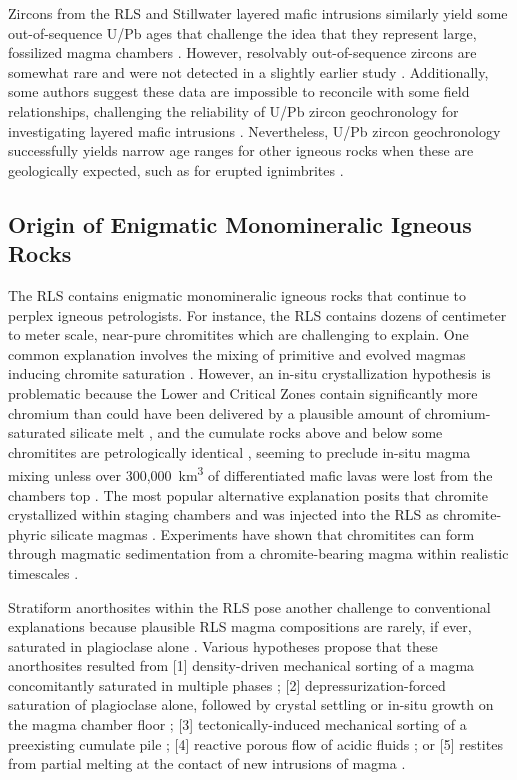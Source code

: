 Zircons from the RLS and Stillwater layered mafic intrusions similarly
yield some out-of-sequence U/Pb ages that challenge the idea that they
represent large, fossilized magma chambers \citep{mungall2016,wall2018,scoates2021}. However, resolvably out-of-sequence
zircons are somewhat rare and were not detected in a slightly earlier
study \citep{zeh2015}. Additionally, some authors suggest these data
are impossible to reconcile with some field relationships, challenging
the reliability of U/Pb zircon geochronology for investigating layered
mafic intrusions \citep{latypovchistyakova2022}. Nevertheless, U/Pb
zircon geochronology successfully yields narrow
age ranges for other igneous rocks when these are geologically expected, such as
for erupted ignimbrites \citep{wotzlaw2013}.

\subsection{Origin of Enigmatic Monomineralic Igneous Rocks}
\label{sec:ch5-origin-of-enigmatic-monomineralic-igneous-rocks}

The RLS contains enigmatic monomineralic igneous rocks that continue to
perplex igneous petrologists. For instance, the RLS contains dozens of
centimeter to meter scale, near-pure chromitites which are challenging
to explain. One common explanation involves the mixing of primitive and
evolved magmas inducing chromite saturation \citep{irvine1977}. However, an
in-situ crystallization hypothesis is problematic because the Lower and
Critical Zones contain significantly more chromium than could have been
delivered by a plausible amount of chromium-saturated silicate melt
\citep{eales2000}, and the cumulate rocks above and below some chromitites
are petrologically identical \citep{mondal2007}, seeming to
preclude in-situ magma mixing unless over 300,000~km\textsuperscript{3} of differentiated
mafic lavas were lost from the chamber\textquotesingle s top \citep{cawthornwalraven1998}. The most popular alternative explanation posits
that chromite crystallized within staging chambers and was injected into
the RLS as chromite-phyric silicate magmas \citep{mondal2007,eales2000}. Experiments have shown that chromitites can form through
magmatic sedimentation from a chromite-bearing magma within realistic
timescales \citep{manoochehri2014}.

Stratiform anorthosites within the RLS pose another challenge to
conventional explanations because plausible RLS magma compositions are
rarely, if ever, saturated in plagioclase alone \citep{latypov2020,maier2020}. Various hypotheses propose that these anorthosites
resulted from {[}1{]} density-driven mechanical sorting of a magma
concomitantly saturated in multiple phases \citep{cawthorn2009}; {[}2{]} depressurization-forced saturation of plagioclase alone,
followed by crystal settling \citep{yuan2017} or in-situ growth on
the magma chamber floor \citep{latypov2020}; {[}3{]}
tectonically-induced mechanical sorting of a preexisting cumulate pile
\citep{maier2016}; {[}4{]} reactive porous flow of acidic fluids
\citep{maier2020,sonnenthal1992}; or {[}5{]} restites from partial
melting at the contact of new intrusions of magma \citep{mitchell2019}.

